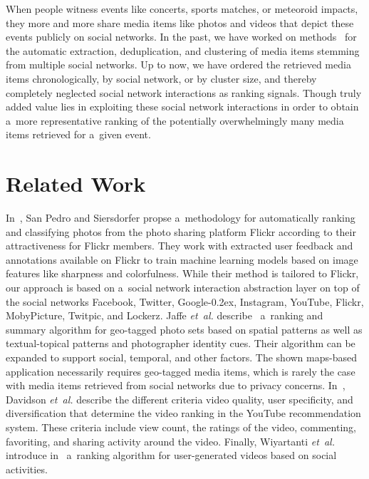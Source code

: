 \documentclass{sig-alt-release2}
\DeclareRobustCommand{\googleplus}{\mbox{Google\hspace{0em}\raisebox{.28ex}{\tiny\bf +}\kern-0.2ex}\xspace}
\begin{document}
When people witness events like concerts, sports matches, or meteoroid impacts,
they more and more share media items like photos and videos
that depict these events publicly on social networks.
In the past, we have worked on methods~%
\cite{khrouf2012aggregatingsocialmedia,rizzo2012whatfresh,steiner2011addingmeaning}
for the automatic extraction, deduplication, and clustering of media items
stemming from multiple social networks.
Up to now, we have ordered the retrieved media items chronologically,
by social network, or by cluster size, and thereby completely neglected
social network interactions as ranking signals.
Though truly added value lies in exploiting these social network interactions
in order to obtain a~more representative ranking of the
potentially overwhelmingly many media items retrieved for a~given event.
\linebreak

\section{Related Work}

In~\cite{sanpedro2009ranking}, San Pedro and Siersdorfer propse a~methodology
for automatically ranking and classifying photos from the photo sharing platform Flickr
according to their attractiveness for Flickr members.
They work with extracted user feedback and annotations available on Flickr
to train machine learning models based on
image features like sharpness and colorfulness.
While their method is tailored to Flickr,
our approach is based on a~social network interaction abstraction layer
on top of the social networks Facebook, Twitter, \googleplus, Instagram,
YouTube, Flickr, MobyPicture, Twitpic, and Lockerz.
Jaffe \emph{et~al.} describe~\cite{jaffe2006generatingsummaries} 
a~ranking and summary algorithm for geo-tagged photo sets based on spatial patterns
as well as textual-topical patterns and photographer identity cues.
Their algorithm can be expanded to support social, temporal, and other factors.
The shown maps-based application necessarily requires geo-tagged media items,
which is rarely the case with media items retrieved from social networks
due to privacy concerns. 
In~\cite{davidson2010youtube}, Davidson \emph{et~al.} describe the different criteria
video quality, user specificity, and diversification
that determine the video ranking in the YouTube recommendation system.
These criteria include view count, the ratings of the video, commenting, favoriting,
and sharing activity around the video.
Finally, Wiyartanti \emph{et~al.} introduce in~\cite{wiyartanti2008ranking}
a~ranking algorithm for user-generated videos based on social activities.
\end{document}
